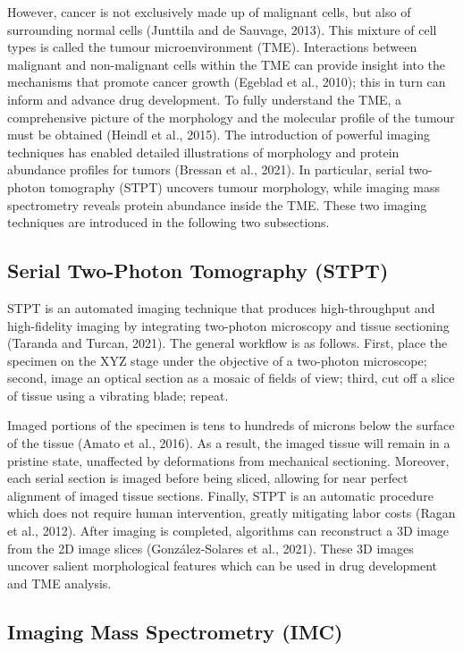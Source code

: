 \documentclass[10pt,twocolumn,letterpaper]{article}
\begin{document}
However, cancer is not exclusively made up of malignant cells, but also of surrounding normal cells (Junttila and de Sauvage, 2013). This mixture of cell types is called the tumour microenvironment (TME). Interactions between malignant and non-malignant cells within the TME can provide insight into the mechanisms that promote cancer growth (Egeblad et al., 2010); this in turn can inform and advance drug development. To fully understand the TME, a comprehensive picture of the morphology and the molecular profile of the tumour must be obtained (Heindl et al., 2015). The introduction of powerful imaging techniques has enabled detailed illustrations of morphology and protein abundance profiles for tumors (Bressan et al., 2021). In particular, serial two-photon tomography (STPT) uncovers tumour morphology, while imaging mass spectrometry reveals protein abundance inside the TME. These two imaging techniques are introduced in the following two subsections.


\subsection{Serial Two-Photon Tomography (STPT)}

STPT is an automated imaging technique that produces high-throughput and high-fidelity imaging by integrating two-photon microscopy and tissue sectioning (Taranda and Turcan, 2021). The general workflow is as follows. First, place the specimen on the XYZ stage under the objective of a two-photon microscope; second, image an optical section as a mosaic of fields of view; third, cut off a slice of tissue using a vibrating blade; repeat. 

Imaged portions of the specimen is tens to hundreds of microns below the surface of the tissue (Amato et al., 2016). As a result, the imaged tissue will remain in a pristine state, unaffected by deformations from mechanical sectioning. Moreover, each serial section is imaged before being sliced, allowing for near perfect alignment of imaged tissue sections. Finally, STPT is an automatic procedure which does not require human intervention, greatly mitigating labor costs (Ragan et al., 2012). After imaging is completed, algorithms can reconstruct a 3D image from the 2D image slices (González-Solares et al., 2021). These 3D images uncover salient morphological features which can be used in drug development and TME analysis.

\subsection{Imaging Mass Spectrometry (IMC)}
\end{document}

